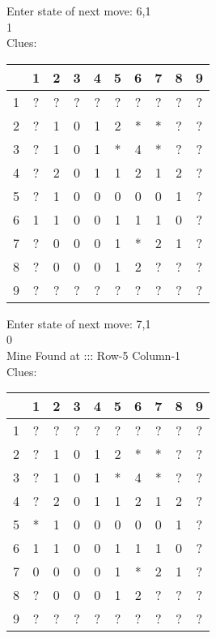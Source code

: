 Enter state of next move: 6,1\\
1\\
Clues:\\
\begin{tabular}{|c|c|c|c|c|c|c|c|c|c|}
\hline
  & 1 & 2 & 3 & 4 & 5 & 6 & 7 & 8 & 9\\
\hline
1 & ? & ? & ? & ? & ? & ? & ? & ? & ?\\
\hline
2 & ? & 1 & 0 & 1 & 2 & * & * & ? & ?\\
\hline
3 & ? & 1 & 0 & 1 & * & 4 & * & ? & ?\\
\hline
4 & ? & 2 & 0 & 1 & 1 & 2 & 1 & 2 & ?\\
\hline
5 & ? & 1 & 0 & 0 & 0 & 0 & 0 & 1 & ?\\
\hline
6 & 1 & 1 & 0 & 0 & 1 & 1 & 1 & 0 & ?\\
\hline
7 & ? & 0 & 0 & 0 & 1 & * & 2 & 1 & ?\\
\hline
8 & ? & 0 & 0 & 0 & 1 & 2 & ? & ? & ?\\
\hline
9 & ? & ? & ? & ? & ? & ? & ? & ? & ?\\
\hline
\end{tabular}

Enter state of next move: 7,1\\
0\\
Mine Found at ::: Row-5 Column-1\\
Clues:\\
\begin{tabular}{|c|c|c|c|c|c|c|c|c|c|}
\hline
  & 1 & 2 & 3 & 4 & 5 & 6 & 7 & 8 & 9\\
\hline
1 & ? & ? & ? & ? & ? & ? & ? & ? & ?\\
\hline
2 & ? & 1 & 0 & 1 & 2 & * & * & ? & ?\\
\hline
3 & ? & 1 & 0 & 1 & * & 4 & * & ? & ?\\
\hline
4 & ? & 2 & 0 & 1 & 1 & 2 & 1 & 2 & ?\\
\hline
5 & * & 1 & 0 & 0 & 0 & 0 & 0 & 1 & ?\\
\hline
6 & 1 & 1 & 0 & 0 & 1 & 1 & 1 & 0 & ?\\
\hline
7 & 0 & 0 & 0 & 0 & 1 & * & 2 & 1 & ?\\
\hline
8 & ? & 0 & 0 & 0 & 1 & 2 & ? & ? & ?\\
\hline
9 & ? & ? & ? & ? & ? & ? & ? & ? & ?\\
\hline
\end{tabular}


